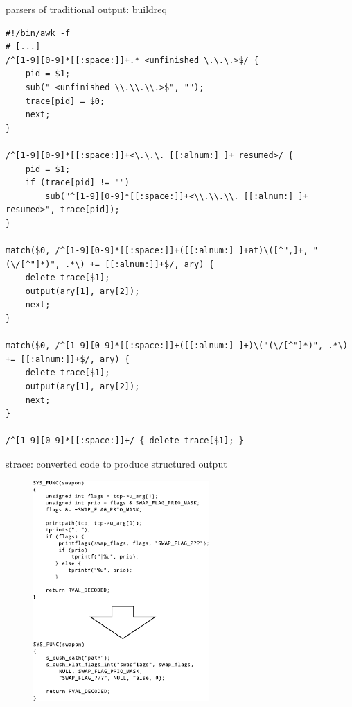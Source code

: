 \documentclass[pdf]{beamer}
\begin{document}
\begin{frame}[fragile]{parsers of traditional output: buildreq}
\begin{adjustwidth}{-1.2em}{-1.2em}
\begin{scriptsize}
\begin{verbatim}
#!/bin/awk -f
# [...]
/^[1-9][0-9]*[[:space:]]+.* <unfinished \.\.\.>$/ {
    pid = $1;
    sub(" <unfinished \\.\\.\\.>$", "");
    trace[pid] = $0;
    next;
}

/^[1-9][0-9]*[[:space:]]+<\.\.\. [[:alnum:]_]+ resumed>/ {
    pid = $1;
    if (trace[pid] != "")
        sub("^[1-9][0-9]*[[:space:]]+<\\.\\.\\. [[:alnum:]_]+ resumed>", trace[pid]);
}

match($0, /^[1-9][0-9]*[[:space:]]+([[:alnum:]_]+at)\([^",]+, "(\/[^"]*)", .*\) += [[:alnum:]]+$/, ary) {
    delete trace[$1];
    output(ary[1], ary[2]);
    next;
}

match($0, /^[1-9][0-9]*[[:space:]]+([[:alnum:]_]+)\("(\/[^"]*)", .*\) += [[:alnum:]]+$/, ary) {
    delete trace[$1];
    output(ary[1], ary[2]);
    next;
}

/^[1-9][0-9]*[[:space:]]+/ { delete trace[$1]; }
\end{verbatim}
\end{scriptsize}
\end{adjustwidth}
\end{frame}


\begin{frame}{strace: converted code to produce structured output}
\begin{figure}[h]
      \includegraphics[width=0.6\textwidth]{lp0-conversion}
\end{figure}
\end{frame}
\end{document}

